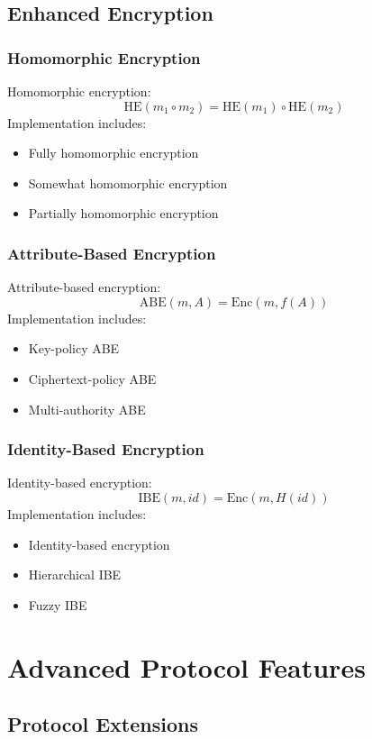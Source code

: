 \documentclass[12pt]{article}
\begin{document}
\subsection{Enhanced Encryption}
\subsubsection{Homomorphic Encryption}
Homomorphic encryption:
\begin{equation}
\text{HE}(m_1 \circ m_2) = \text{HE}(m_1) \circ \text{HE}(m_2)
\end{equation}
Implementation includes:
\begin{itemize}
\item Fully homomorphic encryption
\item Somewhat homomorphic encryption
\item Partially homomorphic encryption
\end{itemize}
\subsubsection{Attribute-Based Encryption}
Attribute-based encryption:
\begin{equation}
\text{ABE}(m,A) = \text{Enc}(m,f(A))
\end{equation}
Implementation includes:
\begin{itemize}
\item Key-policy ABE
\item Ciphertext-policy ABE
\item Multi-authority ABE
\end{itemize}
\subsubsection{Identity-Based Encryption}
Identity-based encryption:
\begin{equation}
\text{IBE}(m,id) = \text{Enc}(m,H(id))
\end{equation}
Implementation includes:
\begin{itemize}
\item Identity-based encryption
\item Hierarchical IBE
\item Fuzzy IBE
\end{itemize}
\section{Advanced Protocol Features}
\subsection{Protocol Extensions}
\end{document}
